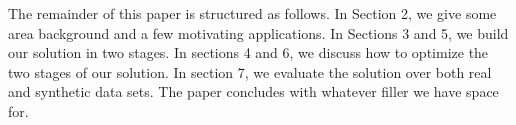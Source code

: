 
The remainder of this paper is structured as follows. In Section 2, we give some area background and a few motivating applications. In Sections 3 and 5, we build our solution in two stages. In sections 4 and 6, we discuss how to optimize the two stages of our solution. In section 7, we evaluate the solution over both real and synthetic data sets. The paper concludes with whatever filler we have space for.






%

